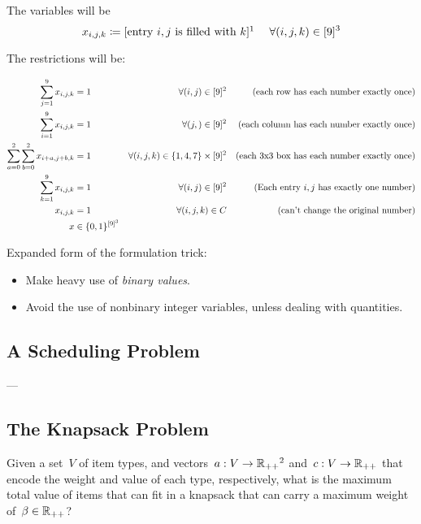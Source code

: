 \documentclass[../main.tex]{subfiles}
\begin{document}
The variables will be
$$x_{i, j, k} \coloneqq [\text{entry } i, j \text{ is filled with } k]\footnotemark \hspace{13pt} \forall (i, j, k) \in [9]^3 $$


The restrictions will be:

\begin{align*}
\sum\limits_{j=1}^9{x_{i,j,k}} &= 1 &\forall (i, j) \in [9]^2 & & \text{(each row has each number exactly once)} \\
\sum\limits_{i=1}^9{x_{i,j,k}} &= 1 &\forall (j, ) \in [9]^2 &  & \text{(each column has each number exactly once)} \\
\sum\limits_{a=0}^2{\sum\limits_{b=0}^2{x_{i+a,j+b,k}}} &= 1 &\forall (i, j, k) \in \{1, 4, 7\} \times [9]^2 & & \text{(each 3x3 box has each number exactly once)} \\
\sum\limits_{k=1}^9{x_{i,j,k}} &= 1 &\forall (i, j) \in [9]^2 & & \text{(Each entry $i, j$ has exactly one number)} \\
x_{i,j,k} &= 1 & \forall (i, j, k) \in C & & \text{(can't change the original number)} \\
x &\in \{0, 1\}^{[9]^3}
\end{align*}

Expanded form of the formulation trick:
\begin{itemize}
\item Make heavy use of \emph{binary values}.
\item Avoid the use of nonbinary integer variables, unless dealing with quantities.
\end{itemize}

\subsection*{A Scheduling Problem}
---

\subsection*{The Knapsack Problem}
Given a set~$V$ of item types, and vectors~${a : V \rightarrow \Rpp\footnotemark}$ and~${c: V \rightarrow \mathbb{R}_{++}}$ that encode the weight and value of each type, respectively, what is the maximum total value of items that can fit in a knapsack that can carry a maximum weight of~${\beta \in \mathbb{R}_{++}}$?

\end{document}
